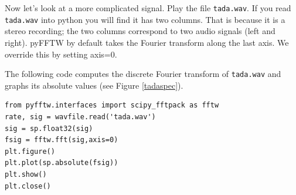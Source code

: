 Now let's look at a more complicated signal. Play the file \texttt{tada.wav}.  
If you read \texttt{tada.wav} into python you will find it has two columns.  
That is because it is a stereo recording; the two columns correspond to two audio signals (left and right).  
pyFFTW by default takes the Fourier transform along the last axis.  We override this by setting axis=0. 

The following code computes the discrete Fourier transform of \texttt{tada.wav} and graphs its absolute values (see Figure \ref{tadaspec}).
\begin{lstlisting}
from pyfftw.interfaces import scipy_fftpack as fftw
rate, sig = wavfile.read('tada.wav')
sig = sp.float32(sig)
fsig = fftw.fft(sig,axis=0)
plt.figure()
plt.plot(sp.absolute(fsig))
plt.show()
plt.close()
\end{lstlisting}


